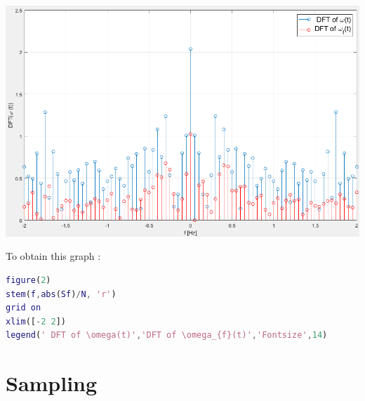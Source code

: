 \documentclass[a4paper,12pt]{article}
\begin{document}
\begin{enumerate}[label={\color{blue}\arabic*)}]
\begin{multicols}{2}
        \begin{flushleft}
            \includegraphics[scale=0.22]{Images/DFT_omega_f.png}
            \label{Figure5}
        \end{flushleft}
    \columnbreak

    To obtain this graph :

    \begin{lstlisting}[style=Matlab-editor,language=Matlab, basicstyle=\small\ttfamily]
figure(2)
stem(f,abs(Sf)/N, 'r')
grid on
xlim([-2 2])
legend(' DFT of \omega(t)','DFT of \omega_{f}(t)','Fontsize',14)
        \end{lstlisting}

    \end{multicols}

\end{enumerate}

\newpage
\section{Sampling}
\end{document}
